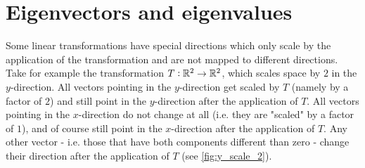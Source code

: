 \section{Eigenvectors and eigenvalues}
Some linear transformations have special directions which only scale by the application of the transformation and are not mapped to different directions. Take for example the transformation $T:\mathbb{R}^{2}\to\mathbb{R}^{2}$, which scales space by $2$ in the $y$-direction. All vectors pointing in the $y$-direction get scaled by $T$ (namely by a factor of $2$) and still point in the $y$-direction after the application of $T$. All vectors pointing in the $x$-direction do not change at all (i.e. they are "scaled" by a factor of $1$), and of course still point in the $x$-direction after the application of $T$. Any other vector - i.e. those that have both components different than zero - change their direction after the application of $T$ (see \autoref{fig:y_scale_2}).

